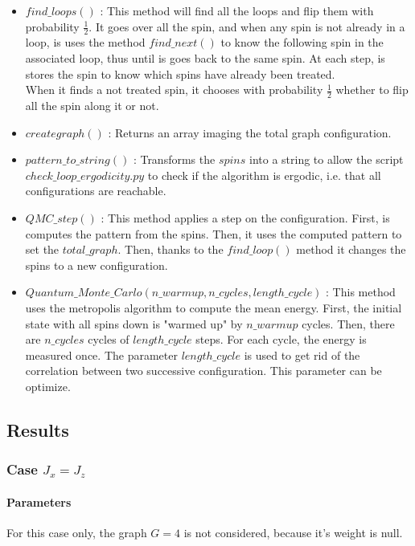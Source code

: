 \documentclass[a4paper,12pt,twoside]{article}
\begin{document}
\begin{itemize}[label=$\star$]
\begin{figure}[!h]
		\end{figure}
		\item $find\_loops()$ : This method will find all the loops and flip them with probability $\frac{1}{2}$. It goes over all the spin, and when any spin is not already in a loop, is uses the method $find\_next()$ to know the following spin in the associated loop, thus until is goes back to the same spin. At each step, is stores the spin to know which spins have already been treated. \\
		When it finds a not treated spin, it chooses with probability $\frac{1}{2}$ whether to flip all the spin along it or not. 
		\item $creategraph()$ : Returns an array imaging the total graph configuration.
		\item $pattern\_to\_string()$ : Transforms the $spins$ into a string to allow the script $check\_loop\_ergodicity.py$ to check if the algorithm is ergodic, i.e. that all configurations are reachable.
		\item $QMC\_step()$ : This method applies a step on the configuration. First, is computes the pattern from the spins. Then, it uses the computed pattern to set the $total\_graph$. Then, thanks to the $find\_loop()$ method it changes the spins to a new configuration.
		\item $Quantum\_Monte\_Carlo(n\_warmup, n\_cycles, length\_cycle)$ : This method uses the metropolis algorithm to compute the mean energy. First, the initial state with all spins down is "warmed up" by $n\_warmup$ cycles. Then, there are $n\_cycles$ cycles of $length\_cycle$ steps. For each cycle, the energy is measured once. The parameter $length\_cycle$ is used to get rid of the correlation between two successive configuration. This parameter can be optimize. 
	\end{itemize}
	
	\subsection{Results}
	
	\subsubsection{Case $J_{x} = J_{z}$}
	
	\paragraph{Parameters} For this case only, the graph $G = 4$ is not considered, because it's weight is null. 
	
\end{document}
